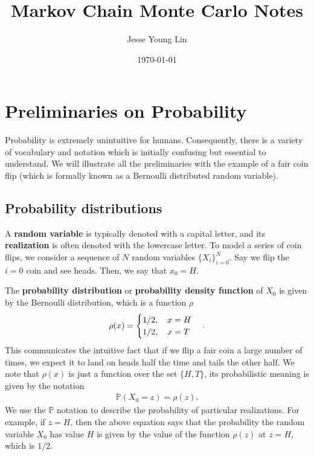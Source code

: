 \documentclass[11pt]{article}
\author{Jesse Young Lin}
\date{\today}
\title{Markov Chain Monte Carlo Notes}
\begin{document}
\maketitle
\tableofcontents

\section{Preliminaries on Probability}
\label{sec:org8ff29c6}
Probability is extremely unintuitive for humans. Consequently,
there is a variety of vocabulary and notation which is initially confusing but
essential to understand. We will illustrate all the preliminaries with the
example of a fair coin flip (which is formally known as a Bernoulli distributed
random variable).
\subsection{Probability distributions}
\label{sec:org2dad992}
A \textbf{random variable} is typically denoted with a capital letter, and its
\textbf{realization} is often denoted with the lowercase letter. To model a series of
coin flips, we consider a sequence of \(N\) random variables
\(\{X_{i}\}_{i=0}^{N}\). Say we flip the \(i=0\) coin and see heads. Then, we
say that \(x_{0} = H\).

The \textbf{probability distribution} or \textbf{probability density function} of \(X_{0}\) is
given by the Bernoulli distribution, which is a function \(\rho\)
\begin{align*}
\rho(x) = \begin{cases}
1/2\qc{x = H} \\
1/2\qc{x = T}
\end{cases}.
\end{align*}
This communicates the intuitive fact that if we flip a fair coin a large number
of times, we expect it to land on heads half the time and tails the other half.
We note that \(\rho(x)\) is just a function over the set \(\{H,T\}\), its
probabilistic meaning is given by the notation
\begin{align*}
\mathbb{P}(X_{0} = z) = \rho(z).
\end{align*}
We use the \(\mathbb{P}\) notation to describe the probability of particular
realizations. For example, if \(z = H\), then the above equation says that the
probability the random variable \(X_{0}\) has value \(H\) is given by the value
of the function \(\rho(z)\) at \(z = H\), which is \(1/2\).
\end{document}
